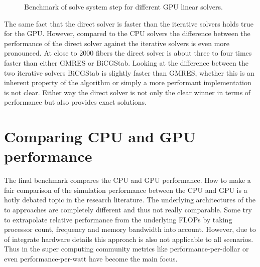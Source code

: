 \documentclass[a4paper,11pt]{kth-mag}
\begin{document}
\begin{figure}[!htbp]
  \centering
  \caption{Benchmark of solve system step for different GPU linear solvers.}
  \label{fig:bench_cuda_solvers}
\end{figure}

The same fact that the direct solver is faster than the iterative solvers holds true for the GPU. However, compared to the CPU solvers the difference between the performance of the direct solver against the iterative solvers is even more pronounced. At close to $2000$ fibers the direct solver is about three to four times faster than either GMRES or BiCGStab. Looking at the difference between the two iterative solvers BiCGStab is slightly faster than GMRES, whether this is an inherent property of the algorithm or simply a more performant implementation is not clear. Either way the direct solver is not only the clear winner in terms of performance but also provides exact solutions.

\section{Comparing CPU and GPU performance}

The final benchmark compares the CPU and GPU performance. How to make a fair comparison of the simulation performance between the CPU and GPU is a hotly debated topic in the research literature. The underlying architectures of the to approaches are completely different and thus not really comparable. Some try to extrapolate relative performance from the underlying FLOPs by taking processor count, frequency and memory bandwidth into account. However, due to of integrate hardware details this approach is also not applicable to all scenarios. Thus in the super computing community metrics like performance-per-dollar or even performance-per-watt have become the main focus.
\end{document}
